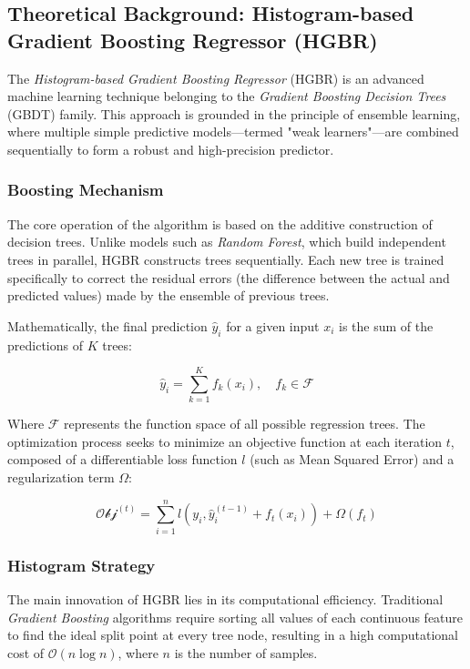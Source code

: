 \subsection{Theoretical Background: Histogram-based Gradient Boosting Regressor (HGBR)}

The \textit{Histogram-based Gradient Boosting Regressor} (HGBR) is an advanced machine learning technique belonging to the \textit{Gradient Boosting Decision Trees} (GBDT) family. This approach is grounded in the principle of ensemble learning, where multiple simple predictive models—termed "weak learners"—are combined sequentially to form a robust and high-precision predictor.

\subsubsection{Boosting Mechanism}

The core operation of the algorithm is based on the additive construction of decision trees. Unlike models such as \textit{Random Forest}, which build independent trees in parallel, HGBR constructs trees sequentially. Each new tree is trained specifically to correct the residual errors (the difference between the actual and predicted values) made by the ensemble of previous trees.

Mathematically, the final prediction $\hat{y}_i$ for a given input $x_i$ is the sum of the predictions of $K$ trees:

\begin{equation}
    \hat{y}_i = \sum_{k=1}^{K} f_k(x_i), \quad f_k \in \mathcal{F}
\end{equation}

Where $\mathcal{F}$ represents the function space of all possible regression trees. The optimization process seeks to minimize an objective function at each iteration $t$, composed of a differentiable loss function $l$ (such as Mean Squared Error) and a regularization term $\Omega$:

\begin{equation}
    \mathcal{Obj}^{(t)} = \sum_{i=1}^{n} l(y_i, \hat{y}_i^{(t-1)} + f_t(x_i)) + \Omega(f_t)
\end{equation}

\subsubsection{Histogram Strategy}

The main innovation of HGBR lies in its computational efficiency. Traditional \textit{Gradient Boosting} algorithms require sorting all values of each continuous feature to find the ideal split point at every tree node, resulting in a high computational cost of $\mathcal{O}(n \log n)$, where $n$ is the number of samples.

